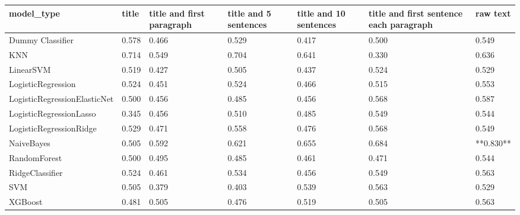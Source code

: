 \begin{tabular}{lllllll}
\toprule
                  model\_type & title & title and first paragraph & title and 5 sentences & title and 10 sentences & title and first sentence each paragraph &  raw text \\
\midrule
            Dummy Classifier & 0.578 &                     0.466 &                 0.529 &                  0.417 &                                   0.500 &     0.549 \\
                         KNN & 0.714 &                     0.549 &                 0.704 &                  0.641 &                                   0.330 &     0.636 \\
                   LinearSVM & 0.519 &                     0.427 &                 0.505 &                  0.437 &                                   0.524 &     0.529 \\
          LogisticRegression & 0.524 &                     0.451 &                 0.524 &                  0.466 &                                   0.515 &     0.553 \\
LogisticRegressionElasticNet & 0.500 &                     0.456 &                 0.485 &                  0.456 &                                   0.568 &     0.587 \\
     LogisticRegressionLasso & 0.345 &                     0.456 &                 0.510 &                  0.485 &                                   0.549 &     0.544 \\
     LogisticRegressionRidge & 0.529 &                     0.471 &                 0.558 &                  0.476 &                                   0.568 &     0.549 \\
                  NaiveBayes & 0.505 &                     0.592 &                 0.621 &                  0.655 &                                   0.684 & **0.830** \\
                RandomForest & 0.500 &                     0.495 &                 0.485 &                  0.461 &                                   0.471 &     0.544 \\
             RidgeClassifier & 0.524 &                     0.461 &                 0.534 &                  0.456 &                                   0.549 &     0.563 \\
                         SVM & 0.505 &                     0.379 &                 0.403 &                  0.539 &                                   0.563 &     0.529 \\
                     XGBoost & 0.481 &                     0.505 &                 0.476 &                  0.519 &                                   0.505 &     0.563 \\
\bottomrule
\end{tabular}
